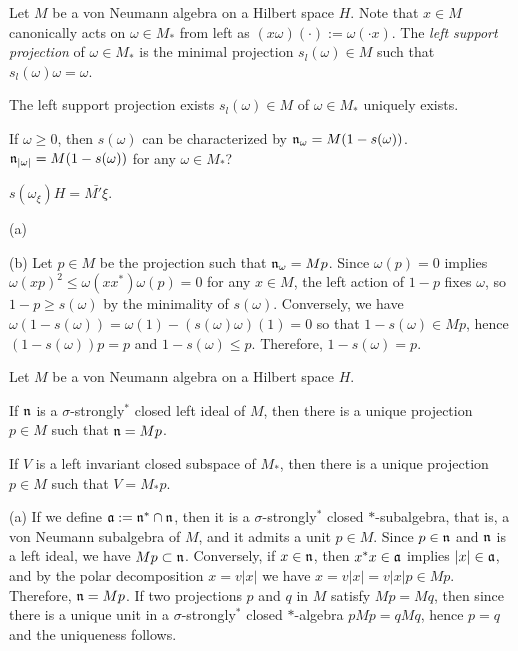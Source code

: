 \documentclass{../../large}
\begin{document}
\begin{prb}
Let $M$ be a von Neumann algebra on a Hilbert space $H$.
Note that $x\in M$ canonically acts on $\omega\in M_*$ from left as $(x\omega)(\cdot):=\omega(\cdot x)$.
The \emph{left support projection} of $\omega\in M_*$ is the minimal projection $s_l(\omega)\in M$ such that $s_l(\omega)\omega=\omega$.

\begin{parts}
\item The left support projection exists $s_l(\omega)\in M$ of $\omega\in M_*$ uniquely exists.
\item If $\omega\ge0$, then $s(\omega)$ can be characterized by $\mathfrak{n}_\omega=M(1-s(\omega))$. $\mathfrak{n}_{|\omega|}=M(1-s(\omega))$ for any $\omega\in M_*$?
\item $s(\omega_\xi)H=\bar{M'\xi}$.
\end{parts}
\end{prb}
\begin{pf}
(a)

(b)
Let $p\in M$ be the projection such that $\mathfrak{n}_\omega=Mp$.
Since $\omega(p)=0$ implies $\omega(xp)^2\le\omega(xx^*)\omega(p)=0$ for any $x\in M$, the left action of $1-p$ fixes $\omega$, so $1-p\ge s(\omega)$ by the minimality of $s(\omega)$.
Conversely, we have $\omega(1-s(\omega))=\omega(1)-(s(\omega)\omega)(1)=0$ so that $1-s(\omega)\in Mp$, hence $(1-s(\omega))p=p$ and $1-s(\omega)\le p$.
Therefore, $1-s(\omega)=p$.

\end{pf}


\begin{prb}
Let $M$ be a von Neumann algebra on a Hilbert space $H$.



\begin{parts}
\item If $\mathfrak{n}$ is a $\sigma$-strongly$^*$ closed left ideal of $M$, then there is a unique projection $p\in M$ such that $\mathfrak{n}=Mp$.
\item If $V$ is a left invariant closed subspace of $M_*$, then there is a unique projection $p\in M$ such that $V=M_*p$.
\end{parts}
\end{prb}
\begin{pf}
(a)
If we define $\mathfrak{a}:=\mathfrak{n}^*\cap\mathfrak{n}$, then it is a $\sigma$-strongly$^*$ closed $*$-subalgebra, that is, a von Neumann subalgebra of $M$, and it admits a unit $p\in M$.
Since $p\in\mathfrak{n}$ and $\mathfrak{n}$ is a left ideal, we have $Mp\subset\mathfrak{n}$.
Conversely, if $x\in\mathfrak{n}$, then $x^*x\in\mathfrak{a}$ implies $|x|\in\mathfrak{a}$, and by the polar decomposition $x=v|x|$ we have $x=v|x|=v|x|p\in Mp$.
Therefore, $\mathfrak{n}=Mp$.
If two projections $p$ and $q$ in $M$ satisfy $Mp=Mq$, then since there is a unique unit in a $\sigma$-strongly$^*$ closed $*$-algebra $pMp=qMq$, hence $p=q$ and the uniqueness follows.

\end{pf}
\end{document}
